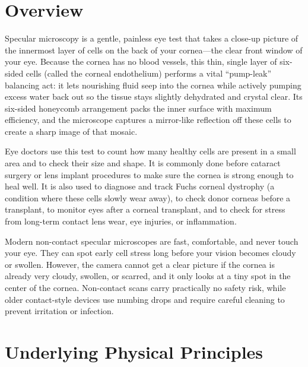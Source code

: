\label{ch:infographic-specular-microscopy}

\section{Overview}

Specular microscopy is a gentle, painless eye test that takes a close-up picture of the innermost layer of cells on the back of your cornea---the clear front window of your eye. Because the cornea has no blood vessels, this thin, single layer of six-sided cells (called the corneal endothelium) performs a vital ``pump-leak'' balancing act: it lets nourishing fluid seep into the cornea while actively pumping excess water back out so the tissue stays slightly dehydrated and crystal clear. Its six-sided honeycomb arrangement packs the inner surface with maximum efficiency, and the microscope captures a mirror-like reflection off these cells to create a sharp image of that mosaic.

Eye doctors use this test to count how many healthy cells are present in a small area and to check their size and shape. It is commonly done before cataract surgery or lens implant procedures to make sure the cornea is strong enough to heal well. It is also used to diagnose and track Fuchs corneal dystrophy (a condition where these cells slowly wear away), to check donor corneas before a transplant, to monitor eyes after a corneal transplant, and to check for stress from long-term contact lens wear, eye injuries, or inflammation.

Modern non-contact specular microscopes are fast, comfortable, and never touch your eye. They can spot early cell stress long before your vision becomes cloudy or swollen. However, the camera cannot get a clear picture if the cornea is already very cloudy, swollen, or scarred, and it only looks at a tiny spot in the center of the cornea. Non-contact scans carry practically no safety risk, while older contact-style devices use numbing drops and require careful cleaning to prevent irritation or infection.

\section{Underlying Physical Principles}

